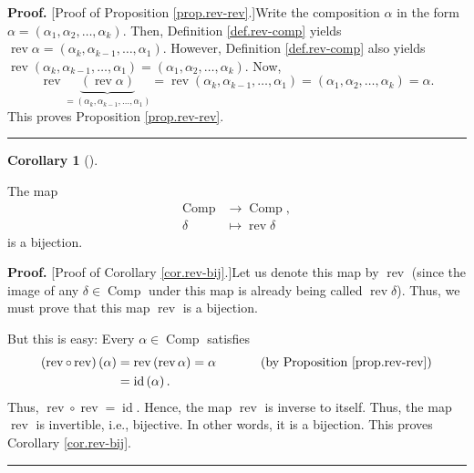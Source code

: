 \documentclass[numbers=enddot,12pt,final,onecolumn,notitlepage]{scrartcl}%
\theoremstyle{definition}
\newtheorem{coro}[theo]{Corollary}
\newenvironment{corollary}[1][]
{\begin{coro}[#1]\begin{leftbar}}
{\end{leftbar}\end{coro}}
\newenvironment{proof}[1][Proof]{\noindent\textbf{#1.} }{\ \rule{0.5em}{0.5em}}
\begin{document}
\begin{proof}
[Proof of Proposition \ref{prop.rev-rev}.]Write the composition $\alpha$ in
the form $\alpha=\left(  \alpha_{1},\alpha_{2},\ldots,\alpha_{k}\right)  $.
Then, Definition \ref{def.rev-comp} yields $\operatorname*{rev}\alpha=\left(
\alpha_{k},\alpha_{k-1},\ldots,\alpha_{1}\right)  $. However, Definition
\ref{def.rev-comp} also yields $\operatorname*{rev}\left(  \alpha_{k}%
,\alpha_{k-1},\ldots,\alpha_{1}\right)  =\left(  \alpha_{1},\alpha_{2}%
,\ldots,\alpha_{k}\right)  $. Now,%
\[
\operatorname*{rev}\underbrace{\left(  \operatorname*{rev}\alpha\right)
}_{=\left(  \alpha_{k},\alpha_{k-1},\ldots,\alpha_{1}\right)  }%
=\operatorname*{rev}\left(  \alpha_{k},\alpha_{k-1},\ldots,\alpha_{1}\right)
=\left(  \alpha_{1},\alpha_{2},\ldots,\alpha_{k}\right)  =\alpha.
\]
This proves Proposition \ref{prop.rev-rev}.
\end{proof}

\begin{corollary}
\label{cor.rev-bij}The map%
\begin{align*}
\operatorname*{Comp}  &  \rightarrow\operatorname*{Comp},\\
\delta &  \mapsto\operatorname*{rev}\delta
\end{align*}
is a bijection.
\end{corollary}

\begin{proof}
[Proof of Corollary \ref{cor.rev-bij}.]Let us denote this map by
$\operatorname*{rev}$ (since the image of any $\delta\in\operatorname*{Comp}$
under this map is already being called $\operatorname*{rev}\delta$). Thus, we
must prove that this map $\operatorname*{rev}$ is a bijection.

But this is easy: Every $\alpha\in\operatorname*{Comp}$ satisfies
\begin{align*}
\left(  \operatorname*{rev}\circ\operatorname*{rev}\right)  \left(
\alpha\right)   &  =\operatorname*{rev}\left(  \operatorname*{rev}%
\alpha\right)  =\alpha\ \ \ \ \ \ \ \ \ \ \left(  \text{by Proposition
\ref{prop.rev-rev}}\right) \\
&  =\operatorname*{id}\left(  \alpha\right)  .
\end{align*}
Thus, $\operatorname*{rev}\circ\operatorname*{rev}=\operatorname*{id}$. Hence,
the map $\operatorname*{rev}$ is inverse to itself. Thus, the map
$\operatorname*{rev}$ is invertible, i.e., bijective. In other words, it is a
bijection. This proves Corollary \ref{cor.rev-bij}.
\end{proof}
\end{document}
